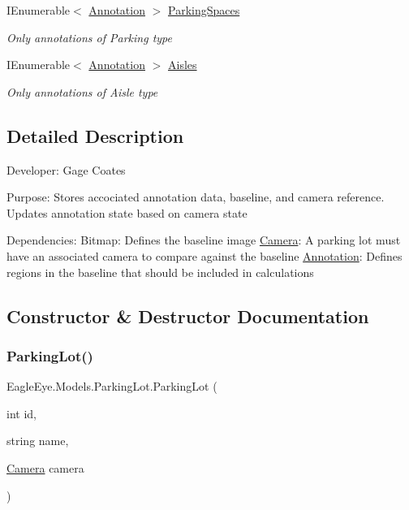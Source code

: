 \begin{DoxyCompactItemize}
I\+Enumerable$<$ \mbox{\hyperlink{class_eagle_eye_1_1_models_1_1_annotation}{Annotation}} $>$ \mbox{\hyperlink{class_eagle_eye_1_1_models_1_1_parking_lot_af3127595a546a4f0b4c4dcda6e72fc3f}{Parking\+Spaces}}
\begin{DoxyCompactList}\small\item\em Only annotations of Parking type \end{DoxyCompactList}\item 
I\+Enumerable$<$ \mbox{\hyperlink{class_eagle_eye_1_1_models_1_1_annotation}{Annotation}} $>$ \mbox{\hyperlink{class_eagle_eye_1_1_models_1_1_parking_lot_a75b40067ceecfe2cd6d2bb389817076e}{Aisles}}
\begin{DoxyCompactList}\small\item\em Only annotations of Aisle type \end{DoxyCompactList}\end{DoxyCompactItemize}


\subsection{Detailed Description}
Developer\+: Gage Coates 

Purpose\+: Stores accociated annotation data, baseline, and camera reference. Updates annotation state based on camera state

Dependencies\+: Bitmap\+: Defines the baseline image \mbox{\hyperlink{class_eagle_eye_1_1_models_1_1_camera}{Camera}}\+: A parking lot must have an associated camera to compare against the baseline \mbox{\hyperlink{class_eagle_eye_1_1_models_1_1_annotation}{Annotation}}\+: Defines regions in the baseline that should be included in calculations 

\subsection{Constructor \& Destructor Documentation}
\mbox{\label{class_eagle_eye_1_1_models_1_1_parking_lot_a02ac70305c0a604f9123ccdb0aa5d323}} 
\subsubsection{\texorpdfstring{ParkingLot()}{ParkingLot()}}
{\footnotesize\ttfamily Eagle\+Eye.\+Models.\+Parking\+Lot.\+Parking\+Lot (\begin{DoxyParamCaption}\item[{int}]{id,  }\item[{string}]{name,  }\item[{\mbox{\hyperlink{class_eagle_eye_1_1_models_1_1_camera}{Camera}}}]{camera }\end{DoxyParamCaption})}



